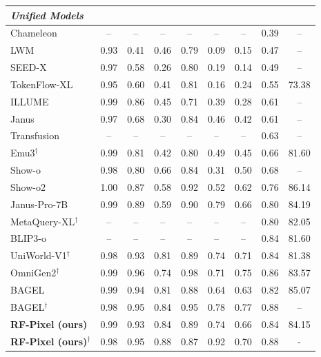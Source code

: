 \begin{table}[t]
\begin{tabular}{l|ccccccc|c}
\midrule
\multicolumn{9}{l}{\textit{Unified Models}} \\
\midrule
Chameleon~\cite{chameleon}         & --   & --   & --   & --   & --   & --   & 0.39 & -- \\
LWM~\cite{lwm}                    & 0.93 & 0.41 & 0.46 & 0.79 & 0.09 & 0.15 & 0.47 & -- \\
SEED-X~\cite{seedx}               & 0.97 & 0.58 & 0.26 & 0.80 & 0.19 & 0.14 & 0.49 & -- \\
TokenFlow-XL~\cite{tokenflow}     & 0.95 & 0.60 & 0.41 & 0.81 & 0.16 & 0.24 & 0.55 & 73.38 \\
ILLUME~\cite{illume}               & 0.99 & 0.86 & 0.45 & 0.71 & 0.39 & 0.28 & 0.61 & -- \\
Janus~\cite{janus}                & 0.97 & 0.68 & 0.30 & 0.84 & 0.46 & 0.42 & 0.61 & -- \\
Transfusion~\cite{transfusion}    & --   & --   & --   & --   & --   & --   & 0.63 & -- \\
Emu3$^\dagger$~\cite{emu3}        & 0.99 & 0.81 & 0.42 & 0.80 & 0.49 & 0.45 & 0.66 & 81.60 \\
Show-o~\cite{showo}               & 0.98 & 0.80 & 0.66 & 0.84 & 0.31 & 0.50 & 0.68 & -- \\
Show-o2~\cite{showo2}             & 1.00 & 0.87 & 0.58 & 0.92 & 0.52 & 0.62 & 0.76 & 86.14 \\
Janus-Pro-7B~\cite{janus-pro}     & 0.99 & 0.89 & 0.59 & 0.90 & 0.79 & 0.66 & 0.80 & 84.19 \\
MetaQuery-XL$^\dagger$~\cite{metaquery} & -- & -- & -- & -- & -- & -- & 0.80 & 82.05 \\
BLIP3-o~\cite{blip3o}             & --   & --   & --   & --   & --   & --   & 0.84 & 81.60 \\
UniWorld-V1$^\dagger$~\cite{uniworld} & 0.98 & 0.93 & 0.81 & 0.89 & 0.74 & 0.71 & 0.84 & 81.38 \\
OmniGen2$^\dagger$~\cite{omnigen2} & 0.99 & 0.96 & 0.74 & 0.98 & 0.71 & 0.75 & 0.86 & 83.57 \\
BAGEL~\cite{bagel}                & 0.99 & 0.94 & 0.81 & 0.88 & 0.64 & 0.63 & 0.82 & 85.07 \\
BAGEL$^\dagger$~\cite{bagel}      & 0.98 & 0.95 & 0.84 & 0.95 & 0.78 & 0.77 & 0.88 & -- \\
\midrule
\rowcolor{gray!10}\textbf{RF-Pixel (ours)} & 0.99 & 0.93 & 0.84 & 0.89 & 0.74 & 0.66 & 0.84 & 84.15 \\
\rowcolor{gray!10}\textbf{RF-Pixel (ours)}$^\dagger$ & 0.98 & 0.95 & 0.88 & 0.87 & 0.92 & 0.70 & 0.88 &-  \\
\bottomrule
\end{tabular}
\end{table}

